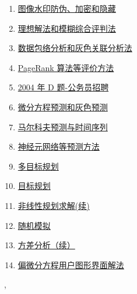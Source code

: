 \documentclass[11pt]{article}
\renewcommand{\today}{\shortmonthname[\the\month] \the \day,  \the\year}
\begin{document}
\begin{multicols}{2}
\begin{enumerate}
		\item \href{https://mp.weixin.qq.com/s/xMRGrzlDTTzA8Ek2quSUiw}{图像水印防伪、加密和隐藏}	%
		\item \href{https://mp.weixin.qq.com/s/rqa-x42I7c4EO7wtZH5j0Q}{理想解法和模糊综合评判法}	%
		\item \href{https://mp.weixin.qq.com/s/s1fx-WboCbbGAfVN1lDfeQ}{数据包络分析和灰色关联分析法}	%
		\item \href{https://mp.weixin.qq.com/s/XaFzc4loBcXUi8TMdOeTag}{PageRank 算法等评价方法}	%
		\item \href{https://mp.weixin.qq.com/s/GncWotTSPKNxflMOcFKbMA}{2004 年 D 题-公务员招聘}	%
		\item \href{https://mp.weixin.qq.com/s/cDpUOqocn_r8WkS-e3CWQw}{微分方程预测和灰色预测}	%
		\item \href{https://mp.weixin.qq.com/s/6YZ8rySBrwh0yc-seqgsTg}{马尔科夫预测与时间序列}	%
		\item \href{https://mp.weixin.qq.com/s/kaIexZTaeHAGGItE3Jd8aQ}{神经元网络等预测方法}	%
		\item \href{https://mp.weixin.qq.com/s/YenAIk1IoIC8eUcboU4Jiw}{多目标规划}	%
		\item \href{https://mp.weixin.qq.com/s/CS515rP1lyVmp0be7YxTiQ}{目标规划}	%
		\item \href{https://mp.weixin.qq.com/s/eNvcjplWDnowNRCtr-I9Rg}{非线性规划求解(续)}	%
		\item \href{https://mp.weixin.qq.com/s/vGCKnUWlAos50BeAaJsLVA}{随机模拟}	%
		\item \href{https://mp.weixin.qq.com/s/bavmERVL-tU8auiEVpwAfQ}{方差分析（续）}	%
		\item \href{https://mp.weixin.qq.com/s/-CACOvDUoE3TF069g1cqdQ}{偏微分方程用户图形界面解法}	%
	\end{enumerate}
\end{multicols}






%
\begin{flushright}
	\tiny \today 
\end{flushright}
\end{document}
